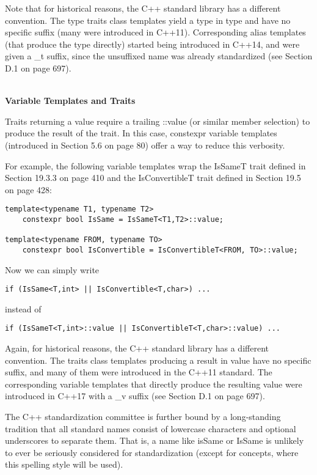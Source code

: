 Note that for historical reasons, the C++ standard library has a different convention. The type traits class templates yield a type in type and have no specific suffix (many were introduced in C++11). Corresponding alias templates (that produce the type directly) started being introduced in C++14, and were given a \_t suffix, since the unsuffixed name was already standardized (see Section D.1 on page 697).

\hspace*{\fill} \\ %
\noindent
\textbf{Variable Templates and Traits}

Traits returning a value require a trailing ::value (or similar member selection) to produce the result of the trait. In this case, constexpr variable templates (introduced in Section 5.6 on page 80) offer a way to reduce this verbosity.

For example, the following variable templates wrap the IsSameT trait defined in Section 19.3.3 on page 410 and the IsConvertibleT trait defined in Section 19.5 on page 428:

\begin{lstlisting}[style=styleCXX]
template<typename T1, typename T2>
	constexpr bool IsSame = IsSameT<T1,T2>::value;
	
template<typename FROM, typename TO>
	constexpr bool IsConvertible = IsConvertibleT<FROM, TO>::value;
\end{lstlisting}

Now we can simply write

\begin{lstlisting}[style=styleCXX]
if (IsSame<T,int> || IsConvertible<T,char>) ...
\end{lstlisting}

instead of

\begin{lstlisting}[style=styleCXX]
if (IsSameT<T,int>::value || IsConvertibleT<T,char>::value) ...
\end{lstlisting}

Again, for historical reasons, the C++ standard library has a different convention. The traits class templates producing a result in value have no specific suffix, and many of them were introduced in the C++11 standard. The corresponding variable templates that directly produce the resulting value were introduced in C++17 with a \_v suffix (see Section D.1 on page 697).

\begin{tcolorbox}[colback=webgreen!5!white,colframe=webgreen!75!black]
\hspace*{0.75cm}The C++ standardization committee is further bound by a long-standing tradition that all standard names consist of lowercase characters and optional underscores to separate them. That is, a name like isSame or IsSame is unlikely to ever be seriously considered for standardization (except for concepts, where this spelling style will be used).
\end{tcolorbox}




